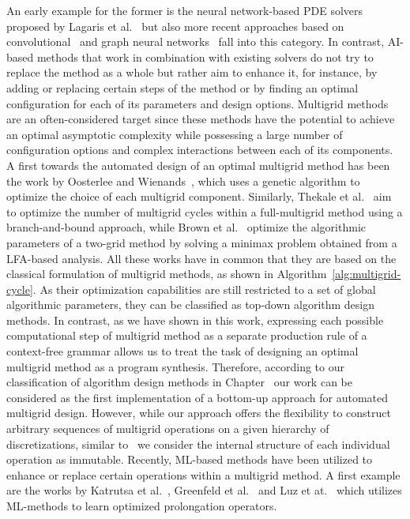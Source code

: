 An early example for the former is the neural network-based PDE solvers proposed by Lagaris et al.~\cite{lagaris1998artificial} but also more recent approaches based on convolutional~\cite{thuerey2020deep} and graph neural networks~\cite{pfaff2020learning} fall into this category.
In contrast, AI-based methods that work in combination with existing solvers do not try to replace the method as a whole but rather aim to enhance it, for instance, by adding or replacing certain steps of the method or by finding an optimal configuration for each of its parameters and design options.
Multigrid methods are an often-considered target since these methods have the potential to achieve an optimal asymptotic complexity while possessing a large number of configuration options and complex interactions between each of its components.
A first towards the automated design of an optimal multigrid method has been the work by Oosterlee and Wienands~\cite{oosterlee2003genetic}, which uses a genetic algorithm to optimize the choice of each multigrid component.
Similarly, Thekale et al.~\cite{thekale2010optimizing} aim to optimize the number of multigrid cycles within a full-multigrid method using a branch-and-bound approach, while Brown et al.~\cite{brown2021tuning} optimize the algorithmic parameters of a two-grid method by solving a minimax problem obtained from a LFA-based analysis.
All these works have in common that they are based on the classical formulation of multigrid methods, as shown in Algorithm~\ref{alg:multigrid-cycle}.
As their optimization capabilities are still restricted to a set of global algorithmic parameters, they can be classified as top-down algorithm design methods.
In contrast, as we have shown in this work, expressing each possible computational step of multigrid method as a separate production rule of a context-free grammar allows us to treat the task of designing an optimal multigrid method as a program synthesis.
Therefore, according to our classification of algorithm design methods in Chapter~%
our work can be considered as the first implementation of a bottom-up approach for automated multigrid design.
However, while our approach offers the flexibility to construct arbitrary sequences of multigrid operations on a given hierarchy of discretizations, similar to~\cite{oosterlee2003genetic,thekale2010optimizing,brown2021tuning} we consider the internal structure of each individual operation as immutable.
Recently, ML-based methods have been utilized to enhance or replace certain operations within a multigrid method.
A first example are the works by Katrutsa et al.~\cite{katrutsa2020black}, Greenfeld et al.~\cite{greenfeld2019learning} and Luz et at.~\cite{luz2020learning} which utilizes ML-methods to learn optimized prolongation operators.
